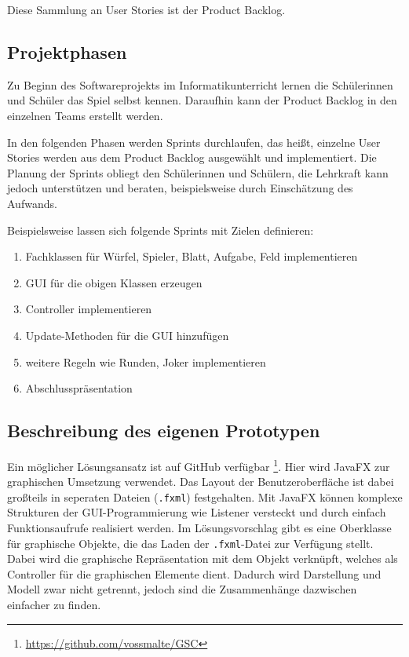 \documentclass[a4paper,12pt]{article}
\newcommand{\sus}{Schülerinnen und Schüler}
\newcommand{\susn}{\sus n}
\begin{document}
    Diese Sammlung an User Stories ist der Product Backlog.
    
\subsection{Projektphasen}
    Zu Beginn des Softwareprojekts im Informatikunterricht lernen die \sus{} das Spiel selbst kennen.
    Daraufhin kann der Product Backlog in den einzelnen Teams erstellt werden.
    
    In den folgenden Phasen werden Sprints durchlaufen, das heißt, einzelne User Stories werden aus dem 
    Product Backlog ausgewählt und implementiert.
    Die Planung der Sprints obliegt den \susn{}, die Lehrkraft kann jedoch unterstützen und beraten,
    beispielsweise durch Einschätzung des Aufwands.
    
    Beispielsweise lassen sich folgende Sprints mit Zielen definieren:
    \begin{enumerate}
        \item Fachklassen für Würfel, Spieler, Blatt, Aufgabe, Feld implementieren
        \item GUI für die obigen Klassen erzeugen
        \item Controller implementieren
        \item Update-Methoden für die GUI hinzufügen
        \item weitere Regeln wie Runden, Joker implementieren
        \item Abschlusspräsentation
    \end{enumerate}

\subsection{Beschreibung des eigenen Prototypen}

    Ein möglicher Lösungsansatz ist auf GitHub verfügbar 
    \footnote{\url{https://github.com/vossmalte/GSC}}.
    Hier wird JavaFX zur graphischen Umsetzung verwendet.
    Das Layout der Benutzeroberfläche ist dabei großteils in seperaten Dateien 
    (\texttt{.fxml}) festgehalten.
    Mit JavaFX können komplexe Strukturen der GUI-Programmierung wie Listener versteckt und 
    durch einfach Funktionsaufrufe realisiert werden.
    Im Lösungsvorschlag gibt es eine Oberklasse für graphische Objekte,
    die das Laden der \texttt{.fxml}-Datei zur Verfügung stellt.
    Dabei wird die graphische Repräsentation mit dem Objekt verknüpft,
    welches als Controller für die graphischen Elemente dient.
    Dadurch wird Darstellung und Modell zwar nicht getrennt,
    jedoch sind die Zusammenhänge dazwischen einfacher zu finden.
\end{document}
